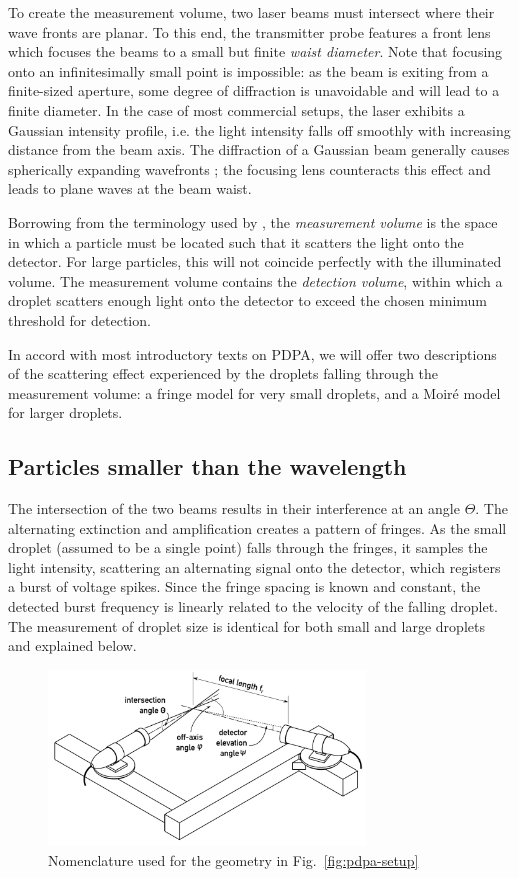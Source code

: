 \documentclass[11.5pt,oneside]{book}
\newcommand*{\figref}[1]{Fig.~\ref{#1}}
\begin{document}
To create the measurement volume, two laser beams must intersect where their
wave fronts are planar. To this end, the transmitter probe features a front lens
which focuses the beams to a small but finite \emph{waist diameter}. Note that
focusing onto an infinitesimally small point is impossible: as the beam is
exiting from a finite-sized aperture, some degree of diffraction is unavoidable
and will lead to a finite diameter. In the case of most commercial setups, the
laser exhibits a Gaussian intensity profile, i.e. the light intensity falls off
smoothly with increasing distance from the beam axis. The diffraction of a
Gaussian beam generally causes spherically expanding wavefronts
\cite{Thyagarajan10}; the focusing lens counteracts this effect and leads to
plane waves at the beam waist.

Borrowing from the terminology used by \citet{Albrecht03}, the \emph{measurement
volume} is the space in which a particle must be located such that it scatters
the light onto the detector. For large particles, this will not coincide
perfectly with the illuminated volume. The measurement volume contains the
\emph{detection volume}, within which a droplet scatters enough light onto the
detector to exceed the chosen minimum threshold for detection.

In accord with most introductory texts on PDPA, we will offer two descriptions
of the scattering effect experienced by the droplets falling through the
measurement volume: a fringe model for very small droplets, and a Moiré model
for larger droplets.

\subsection{Particles smaller than the wavelength}
The intersection of the two beams results in their interference at an angle
$\Theta$. The alternating extinction and amplification creates a pattern of
fringes. As the small droplet (assumed to be a single point) falls through the
fringes, it samples the light intensity, scattering an alternating signal onto
the detector, which registers a burst of voltage spikes. Since the fringe
spacing is known and constant, the detected burst frequency is linearly related
to the velocity of the falling droplet. The measurement of droplet size is
identical for both small and large droplets and explained below.

\begin{figure}
    \centering
    \includegraphics[width=0.75\textwidth]{img/setup/pdpa_angles.pdf}
    \caption{Nomenclature used for the geometry in \figref{fig:pdpa-setup} \label{fig:pdpa-angles}}
\end{figure}
\end{document}
